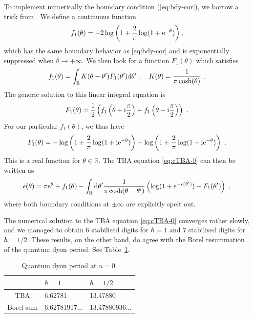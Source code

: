 \documentclass[a4paper,11pt]{article}
\theoremstyle{definition}
\def\IR{{\mathbb R}}
\newcommand{\re}{{\rm e}}
\newcommand{\ri}{{\rm i}}
\newcommand{\rd}{{\rm d}}
\def\IR{\mathbb{R}}
\def\({\left(}
\def\){\right)}
\begin{document}
To implement numerically the boundary condition (\ref{eq:bdy-cor}), we
borrow a trick from \cite{post-zamo}. We define a continuous function
%
\begin{equation}
  f_1(\theta) = -2\log\left(1+\frac{2}{\pi}\log(1+\re^{-\theta})\right),
\end{equation}
%
 which has the same boundary behavior as
\eqref{eq:bdy-cor} and is exponentially suppressed when
$\theta \to +\infty$. We then look for a function $F_1(\theta)$ which
satisfies
\begin{equation}
  f_1(\theta) = \int_{\IR} K(\theta-\theta') F_1(\theta')\rd \theta' \
  ,\quad K(\theta) = \frac{1}{\pi\cosh(\theta)}\ .
\end{equation}
The generic solution to this linear integral equation  is
%
\begin{equation}
  F_1(\theta) = \frac{1}{2}\left(f_1\left(\theta+\ri\frac{\pi}{2}\right) +
  f_1 \left(\theta-\ri\frac{\pi}{2}\right)\right) \ .
\end{equation}
%
For our particular $f_1(\theta)$, we thus have
%
\begin{equation}
  F_1(\theta) =
  -\log\left(1+\frac{2}{\pi}\log(1+\ri\re^{-\theta})\right)
  -\log\left(1+\frac{2}{\pi}\log(1-\ri\re^{-\theta})\right)
  \ .
\end{equation}
%
This is a real function for $\theta\in\IR$. The TBA equation
\eqref{eq:cTBA-0} can then be written as
\begin{equation}\label{eq:TBA-SW2}
  \epsilon(\theta) = \pi \re^{\theta} + f_1(\theta) -
  \int_{\IR}\rd \theta'
  \frac{1}{\pi\cosh(\theta-\theta')}
  \(\log(1+\re^{-\epsilon(\theta')})+F_1(\theta')\) 
  \ ,
\end{equation}
%
where both boundary conditions at $\pm \infty$ are explicitly
spelt out.

The numerical solution to the
TBA equation \eqref{eq:cTBA-0} converges rather slowly, and we managed
to obtain 6 stabilised digits for $\hbar = 1$ and 7 stabilised digits
for $\hbar = 1/2$. These results, on the other hand, do agree with the
Borel resummation of the quantum dyon period. See Table~\ref{tb:TBA}.

\begin{table}
  \centering
  \begin{tabular}{cll}\toprule
    &$\hbar = 1$ & $\hbar = 1/2 $\\\midrule
    TBA & 6.62781 & 13.47880 \\    
    Borel sum & 6.62781917$\ldots$ & 13.47880936$\ldots$\\
    \bottomrule
  \end{tabular}
  \caption{Quantum dyon period at $u=0$.}\label{tb:TBA}
\end{table}
\end{document}
